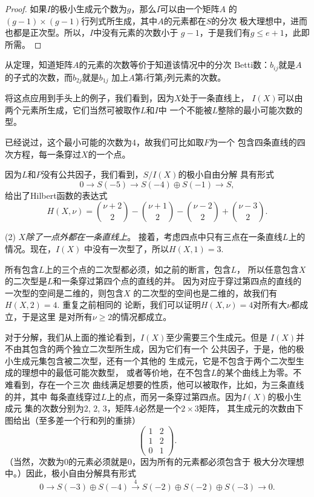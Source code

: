 \begin{proof}
如果$I$的极小生成元个数为$g$，那么$I$可以由一个矩阵$A$
的$(g-1)\times (g-1)$行列式所生成，其中$A$的元素都在$S$的分次
极大理想中，进而也都是正次型。所以，$I$中没有元素的次数小于
$g-1$，于是我们有$g\leq e+1$，此即所需。
\end{proof}

从定理，知道矩阵$A$的元素的次数等价于知道该情况中的分次
Betti数：$b_{ij}$就是$A$的子式的次数，而$b_{2j}$就是$b_{1j}$
加上$A$第$i$行第$j$列元素的次数。

将这点应用到手头上的例子，我们看到，因为$X$处于一条直线上，
$I(X)$可以由两个元素所生成，它们当然可被取作$L$和$I$中
一个不能被$L$整除的最小可能次数的型。


已经说过，这个最小可能的次数为$4$，故我们可比如取$F$为一个
包含四条直线的四次方程，每一条穿过$X$的一个点。

因为$L$和$P$没有公共因子，我们看到，$S/I(X)$的极小自由分解
具有形式
\[
	0\longrightarrow S(-5)\longrightarrow S(-4)\oplus
	S(-1)\longrightarrow S,
\]
给出了Hilbert函数的表达式
\[
	H(X,\nu)=\binom{\nu+2}{2}-\binom{\nu+1}{2}
	-\binom{\nu-2}{2}+\binom{\nu-3}{2}.
\]

(2) \textit{$X$除了一点外都在一条直线上}。
接着，考虑四点中只有三点在一条直线$L$上的情况。现在，$I(X)$
中没有一次型了，所以$H(X,1)=3$.


所有包含$L$上的三个点的二次型都必须，如之前的断言，包含$L$，
所以任意包含$X$的二次型是$L$和一条穿过第四个点的直线的并。
因为对应于穿过第四点的直线的一次型的空间是二维的，则包含$X$
的二次型的空间也是二维的，故我们有$H(X,2)=4$. 重复之前相同的
论断，我们可以证明$H(X,\nu)=4$对所有大$\nu$都成立，于是这里
是对所有$\nu\geq 2$的情况都成立。


对于分解，我们从上面的推论看到，$I(X)$至少需要三个生成元。但是
$I(X)$并不由其包含的两个独立二次型所生成，因为它们有一个
公共因子，于是，他的极小生成元集包含被二次型，还有一个其他的
生成元，它是不包含于两个二次型生成的理想中的最低可能次数型，
或者等价地，在不包含$L$的某个曲线上为零。不难看到，存在一个三次
曲线满足想要的性质，他可以被取作，比如，为三条直线的并，其中
每条直线穿过$L$上的点，而另一条穿过第四点。因为$I(X)$的极小生成元
集的次数分别为$2$, $2$, $3$，矩阵$A$必然是一个$2\times 3$矩阵，
其生成元的次数由下图给出（至多差一个行和列的重排）
\[
	\begin{pmatrix}
		1&2\\
		1&2\\
		0&1
	\end{pmatrix}.
\]
（当然，次数为$0$的元素必须就是$0$，因为所有的元素都必须包含于
极大分次理想中。）因此，极小自由分解具有形式
\[
	0\longrightarrow S(-3)\oplus S(-4)\xrightarrow{4}
	S(-2)\oplus S(-2)\oplus S(-3)\longrightarrow 0.
\]

